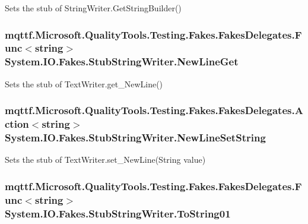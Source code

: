 Sets the stub of String\-Writer.\-Get\-String\-Builder()

\hypertarget{class_system_1_1_i_o_1_1_fakes_1_1_stub_string_writer_a301e5c1bbe6109cc4e0f993b0619c2b7}{
\subsubsection[{New\-Line\-Get}]{\setlength{\rightskip}{0pt plus 5cm}mqttf.\-Microsoft.\-Quality\-Tools.\-Testing.\-Fakes.\-Fakes\-Delegates.\-Func$<$string$>$ System.\-I\-O.\-Fakes.\-Stub\-String\-Writer.\-New\-Line\-Get}}\label{class_system_1_1_i_o_1_1_fakes_1_1_stub_string_writer_a301e5c1bbe6109cc4e0f993b0619c2b7}


Sets the stub of Text\-Writer.\-get\-\_\-\-New\-Line()

\hypertarget{class_system_1_1_i_o_1_1_fakes_1_1_stub_string_writer_a8c0ed1c0432c215d8e3522ad7c4f1461}{
\subsubsection[{New\-Line\-Set\-String}]{\setlength{\rightskip}{0pt plus 5cm}mqttf.\-Microsoft.\-Quality\-Tools.\-Testing.\-Fakes.\-Fakes\-Delegates.\-Action$<$string$>$ System.\-I\-O.\-Fakes.\-Stub\-String\-Writer.\-New\-Line\-Set\-String}}\label{class_system_1_1_i_o_1_1_fakes_1_1_stub_string_writer_a8c0ed1c0432c215d8e3522ad7c4f1461}


Sets the stub of Text\-Writer.\-set\-\_\-\-New\-Line(\-String value)

\hypertarget{class_system_1_1_i_o_1_1_fakes_1_1_stub_string_writer_ae067fb44d6e25fe11f952a800643c085}{
\subsubsection[{To\-String01}]{\setlength{\rightskip}{0pt plus 5cm}mqttf.\-Microsoft.\-Quality\-Tools.\-Testing.\-Fakes.\-Fakes\-Delegates.\-Func$<$string$>$ System.\-I\-O.\-Fakes.\-Stub\-String\-Writer.\-To\-String01}}\label{class_system_1_1_i_o_1_1_fakes_1_1_stub_string_writer_ae067fb44d6e25fe11f952a800643c085}


